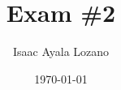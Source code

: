 \documentclass[a4paper,12pt]{article}
\title{Exam \#2}
\author{Isaac Ayala Lozano}
\date{\today}
\begin{document}
\maketitle






\newpage
\pagebreak
\printbibliography

% 
\end{document}
